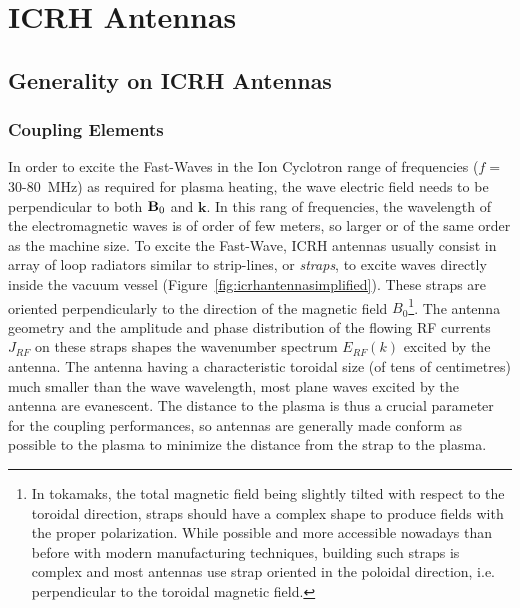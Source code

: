 \section{ICRH Antennas}\label{sec:ICRH_antennas}

\subsection{Generality on ICRH Antennas}

\subsubsection{Coupling Elements}
In order to excite the Fast-Waves in the Ion Cyclotron range of frequencies ($f=$30-80~MHz) as required for plasma heating, the wave electric field needs to be perpendicular to both ${\mathbf B}_0$ and $\mathbf{k}$. In this rang of frequencies, the wavelength of the electromagnetic waves is of order of few meters, so larger or of the same order as the machine size. To excite the Fast-Wave, ICRH antennas usually consist in array of loop radiators similar to strip-lines, or \textit{straps}, to excite waves directly inside the vacuum vessel (Figure~\ref{fig:icrhantennasimplified}). These straps are oriented perpendicularly to the direction of the magnetic field $B_0$\footnote{In tokamaks, the total magnetic field being slightly tilted with respect to the toroidal direction, straps should have a complex shape to produce fields with the proper polarization. While possible and more accessible nowadays than before with modern manufacturing techniques, building such straps is complex and most antennas use strap oriented in the poloidal direction, i.e. perpendicular to the toroidal magnetic field.}. The antenna geometry and the amplitude and phase distribution of the flowing RF currents $J_{RF}$ on these straps shapes the wavenumber spectrum $E_{RF}(k)$ excited by the antenna. The antenna having a characteristic toroidal size (of tens of centimetres) much smaller than the wave wavelength, most plane waves excited by the antenna are evanescent. The distance to the plasma is thus a crucial parameter for the coupling performances, so antennas are generally made conform as possible to the plasma to minimize the distance from the strap to the plasma. 

